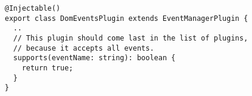 \begin{verbatim}
@Injectable()
export class DomEventsPlugin extends EventManagerPlugin {
  ..
  // This plugin should come last in the list of plugins,
  // because it accepts all events.
  supports(eventName: string): boolean {
    return true;
  }
}
\end{verbatim}
